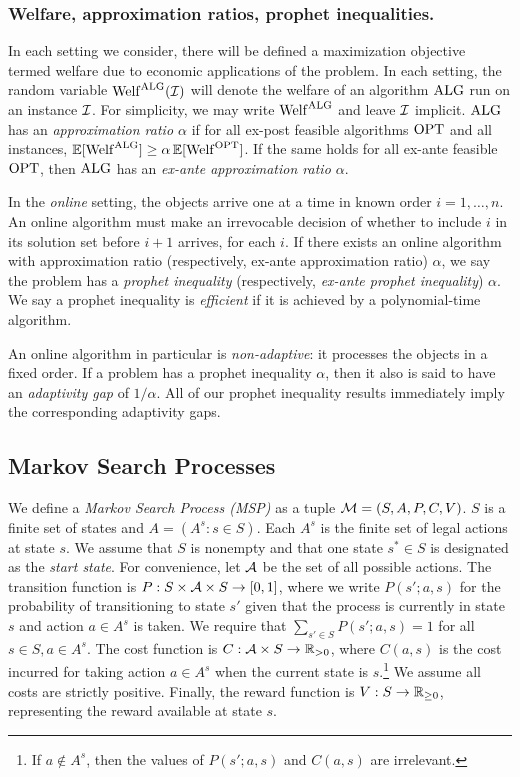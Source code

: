 \subsubsection{Welfare, approximation ratios, prophet inequalities.}
In each setting we consider, there will be defined a maximization objective termed welfare due to economic applications of the problem.
In each setting, the random variable $\mathrm{Welf}^{\mathrm{ALG}}(\mathcal{I})$ will denote the welfare of an algorithm $\mathrm{ALG}$ run on an instance $\mathcal{I}$.
For simplicity, we may write $\mathrm{Welf}^{\mathrm{ALG}}$ and leave $\mathcal{I}$ implicit.
$\mathrm{ALG}$ has an \emph{approximation ratio $\alpha$} if for all ex-post feasible algorithms $\mathrm{OPT}$ and all instances, $\operatorname*{\mathbb{E}}[\mathrm{Welf}^{\mathrm{ALG}}] \geq \alpha \operatorname*{\mathbb{E}}[\mathrm{Welf}^{\mathrm{OPT}}]$.
If the same holds for all ex-ante feasible $\mathrm{OPT}$, then $\mathrm{ALG}$ has an \emph{ex-ante approximation ratio $\alpha$}.

In the \emph{online} setting, the objects arrive one at a time in known order $i=1,\dots,n$.
An online algorithm must make an irrevocable decision of whether to include $i$ in its solution set before $i+1$ arrives, for each $i$.
If there exists an online algorithm with approximation ratio (respectively, ex-ante approximation ratio) $\alpha$, we say the problem has a \emph{prophet inequality} (respectively, \emph{ex-ante prophet inequality}) $\alpha$.
We say a prophet inequality is \emph{efficient} if it is achieved by a polynomial-time algorithm.

An online algorithm in particular is \emph{non-adaptive}: it processes the objects in a fixed order.
If a problem has a prophet inequality $\alpha$, then it also is said to have an \emph{adaptivity gap} of $1/\alpha$.
All of our prophet inequality results immediately imply the corresponding adaptivity gaps.




\subsection{Markov Search Processes} \label{subsec:MSP}

We define a \emph{Markov Search Process (MSP)} as a tuple $\mathcal{M} = (S, A, P, C, V)$.
$S$ is a finite set of states and $A = (A^s : s \in S)$.
Each $A^s$ is the finite set of legal actions at state $s$.
We assume that $S$ is nonempty and that one state $s^* \in S$ is designated as the \emph{start state}.
For convenience, let $\mathcal{A}$ be the set of all possible actions.
The transition function is $P: S \times \mathcal{A} \times S \to [0,1]$, where we write $P(s';a,s)$ for the probability of transitioning to state $s'$ given that the process is currently in state $s$ and action $a \in A^s$ is taken.
We require that $\sum_{s' \in S} P(s';a,s) = 1$ for all $s \in S, a \in A^s$.
The cost function is $C: \mathcal{A} \times S \to \mathbb{R}_{>0}$, where $C(a,s)$ is the cost incurred for taking action $a \in A^s$ when the current state is $s$.\footnote{If $a \not\in A^s$, then the values of $P(s';a,s)$ and $C(a,s)$ are irrelevant.}
We assume all costs are strictly positive.
Finally, the reward function is $V: S \to \mathbb{R}_{\geq 0}$, representing the reward available at state $s$.

